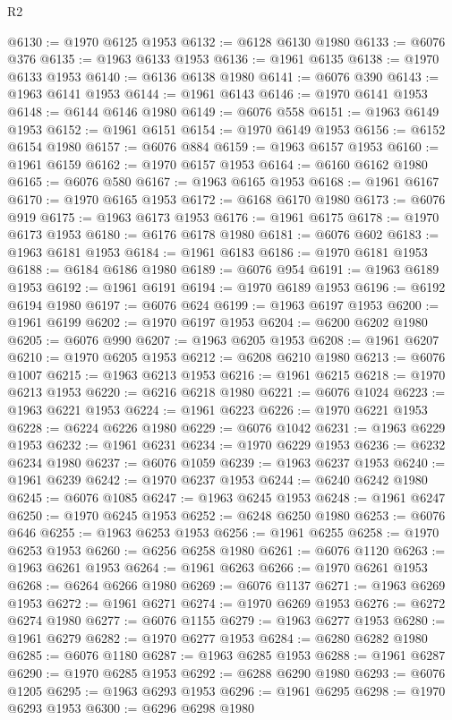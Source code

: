 \begin{lexlean}{R2}
\begin{coremodule}
@6130 := @1970 @6125 @1953
@6132 := @6128 @6130 @1980
@6133 := @6076 @376
@6135 := @1963 @6133 @1953
@6136 := @1961 @6135
@6138 := @1970 @6133 @1953
@6140 := @6136 @6138 @1980
@6141 := @6076 @390
@6143 := @1963 @6141 @1953
@6144 := @1961 @6143
@6146 := @1970 @6141 @1953
@6148 := @6144 @6146 @1980
@6149 := @6076 @558
@6151 := @1963 @6149 @1953
@6152 := @1961 @6151
@6154 := @1970 @6149 @1953
@6156 := @6152 @6154 @1980
@6157 := @6076 @884
@6159 := @1963 @6157 @1953
@6160 := @1961 @6159
@6162 := @1970 @6157 @1953
@6164 := @6160 @6162 @1980
@6165 := @6076 @580
@6167 := @1963 @6165 @1953
@6168 := @1961 @6167
@6170 := @1970 @6165 @1953
@6172 := @6168 @6170 @1980
@6173 := @6076 @919
@6175 := @1963 @6173 @1953
@6176 := @1961 @6175
@6178 := @1970 @6173 @1953
@6180 := @6176 @6178 @1980
@6181 := @6076 @602
@6183 := @1963 @6181 @1953
@6184 := @1961 @6183
@6186 := @1970 @6181 @1953
@6188 := @6184 @6186 @1980
@6189 := @6076 @954
@6191 := @1963 @6189 @1953
@6192 := @1961 @6191
@6194 := @1970 @6189 @1953
@6196 := @6192 @6194 @1980
@6197 := @6076 @624
@6199 := @1963 @6197 @1953
@6200 := @1961 @6199
@6202 := @1970 @6197 @1953
@6204 := @6200 @6202 @1980
@6205 := @6076 @990
@6207 := @1963 @6205 @1953
@6208 := @1961 @6207
@6210 := @1970 @6205 @1953
@6212 := @6208 @6210 @1980
@6213 := @6076 @1007
@6215 := @1963 @6213 @1953
@6216 := @1961 @6215
@6218 := @1970 @6213 @1953
@6220 := @6216 @6218 @1980
@6221 := @6076 @1024
@6223 := @1963 @6221 @1953
@6224 := @1961 @6223
@6226 := @1970 @6221 @1953
@6228 := @6224 @6226 @1980
@6229 := @6076 @1042
@6231 := @1963 @6229 @1953
@6232 := @1961 @6231
@6234 := @1970 @6229 @1953
@6236 := @6232 @6234 @1980
@6237 := @6076 @1059
@6239 := @1963 @6237 @1953
@6240 := @1961 @6239
@6242 := @1970 @6237 @1953
@6244 := @6240 @6242 @1980
@6245 := @6076 @1085
@6247 := @1963 @6245 @1953
@6248 := @1961 @6247
@6250 := @1970 @6245 @1953
@6252 := @6248 @6250 @1980
@6253 := @6076 @646
@6255 := @1963 @6253 @1953
@6256 := @1961 @6255
@6258 := @1970 @6253 @1953
@6260 := @6256 @6258 @1980
@6261 := @6076 @1120
@6263 := @1963 @6261 @1953
@6264 := @1961 @6263
@6266 := @1970 @6261 @1953
@6268 := @6264 @6266 @1980
@6269 := @6076 @1137
@6271 := @1963 @6269 @1953
@6272 := @1961 @6271
@6274 := @1970 @6269 @1953
@6276 := @6272 @6274 @1980
@6277 := @6076 @1155
@6279 := @1963 @6277 @1953
@6280 := @1961 @6279
@6282 := @1970 @6277 @1953
@6284 := @6280 @6282 @1980
@6285 := @6076 @1180
@6287 := @1963 @6285 @1953
@6288 := @1961 @6287
@6290 := @1970 @6285 @1953
@6292 := @6288 @6290 @1980
@6293 := @6076 @1205
@6295 := @1963 @6293 @1953
@6296 := @1961 @6295
@6298 := @1970 @6293 @1953
@6300 := @6296 @6298 @1980

\end{coremodule}
\end{lexlean}
